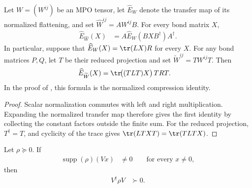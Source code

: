 \begin{lemma}
    \label{thm:mpu_normalized_transfer_sandwich}
    \leanok
    Let $W=(W^{ij})$ be an MPO tensor, let $\widehat E_W$ denote the transfer
    map of its normalized flattening, and set $\widehat W^{ij}=AW^{ij}B$.
    For every bond matrix $X$,
    \begin{align}
        \widehat E_{\widehat W}(X)
         & =A\widehat E_W(BXB^\dagger)A^\dagger.
    \end{align}
    In particular, suppose that $\widehat E_W(X)=\tr(LX)R$ for every $X$.
    For any bond matrices $P,Q$, let $T$ be their reduced projection and set
    $\widetilde W^{ij}=TW^{ij}T$. Then
    \begin{align}
        \widehat E_{\widetilde W}(X)
         & =\tr\!\bigl((TLT)X\bigr)\,TRT.
    \end{align}
    In the proof of \cite[Proposition~IV.5]{Cirac2017MPU}, this formula is the normalized compression
    identity.
\end{lemma}

\begin{proof}\leanok
    Scalar normalization commutes with left and right multiplication.
    Expanding the normalized transfer map therefore gives the first identity
    by collecting the constant factors outside the finite sum. For the
    reduced projection, $T^\dagger=T$, and cyclicity of the trace gives
    $\tr(LTXT)=\tr(TLTX)$.
\end{proof}

\begin{lemma}
    \label{lem:mpu_support_compression_posdef}
    \leanok

    Let $\rho\succeq0$. If
    \begin{align}
        \operatorname{supp}(\rho)(Vx) & \neq0
        \qquad\text{for every }x\neq0,
    \end{align}
    then
    \begin{align}
        V^\dagger\rho V & \succ0.
    \end{align}
\end{lemma}


